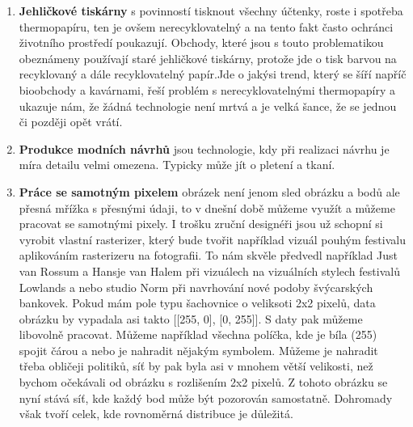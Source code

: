 \documentclass{article}
\begin{document}
\begin{enumerate}
\item \textbf{Jehličkové tiskárny} s povinností tisknout všechny účtenky, roste i spotřeba thermopapíru, ten je ovšem nerecyklovatelný a na tento fakt často ochránci životního prostředí poukazují. Obchody, které jsou s touto problematikou obeznámeny používají staré jehličkové tiskárny, protože jde o tisk barvou na recyklovaný a dále recyklovatelný papír.Jde o jakýsi trend, který se šíří napříč bioobchody a kavárnami, řeší problém s nerecyklovatelnými thermopapíry a ukazuje nám, že žádná technologie není mrtvá a je velká šance, že se jednou či později opět vrátí. 
\item \textbf{Produkce modních návrhů}
jsou technologie, kdy při realizaci návrhu je míra detailu velmi omezena. Typicky může jít o pletení a tkaní.
\item \textbf{Práce se samotným pixelem}
obrázek není jenom sled obrázku a bodů ale přesná mřížka s přesnými údaji, to v dnešní době můžeme využít a můžeme pracovat se samotnými pixely. I trošku zruční designéři jsou už schopní si vyrobit vlastní rasterizer, který bude tvořit například vizuál pouhým festivalu aplikováním rasterizeru na fotografii. To nám skvěle předvedl například Just van Rossum a Hansje van Halem při vizuálech na vizuálních stylech festivalů Lowlands a nebo studio Norm při navrhování nové podoby švýcarských bankovek. Pokud mám pole typu šachovnice o veliksoti 2x2 pixelů, data obrázku by vypadala asi takto [[255, 0], [0, 255]]. S daty pak můžeme libovolně pracovat. Můžeme například všechna políčka, kde je bíla (255) spojit čárou a nebo je nahradit nějakým symbolem. Můžeme je nahradit třeba obličeji politiků, síť by pak byla asi v mnohem větší velikosti, než bychom očekávali od obrázku s rozlišením 2x2 pixelů. Z tohoto obrázku se nyní stává síť, kde každý bod může být pozorován samostatně. Dohromady však tvoří celek, kde rovnoměrná distribuce je důležitá.
\end{enumerate}
\end{document}
